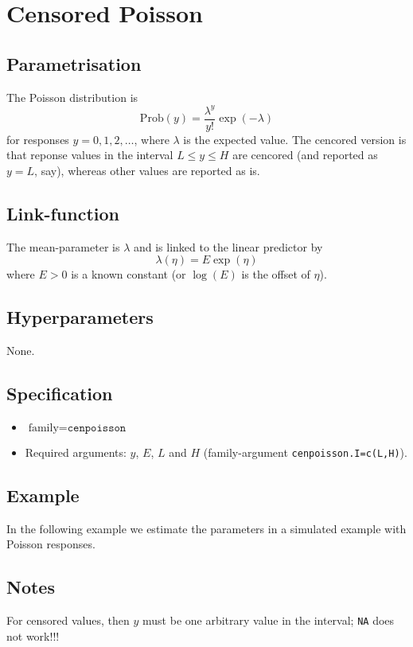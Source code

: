\documentclass[a4paper,11pt]{article}
\begin{document}
\section*{Censored Poisson}

\subsection*{Parametrisation}

The Poisson distribution is
\begin{displaymath}
    \text{Prob}(y) = \frac{\lambda^{y}}{y!}\exp(-\lambda)
\end{displaymath}
for responses $y=0, 1, 2, \ldots$, where $\lambda$ is the expected
value.  The cencored version is that reponse values in the interval
$L \le y \le H$ are cencored (and reported as $y=L$, say), whereas
other values are reported as is.

\subsection*{Link-function}

The mean-parameter is $\lambda$ and is linked to the linear predictor
by
\begin{displaymath}
    \lambda(\eta) = E \exp(\eta)
\end{displaymath}
where $E>0$ is a known constant (or $\log(E)$ is the offset of $\eta$).

\subsection*{Hyperparameters}

None.

\subsection*{Specification}

\begin{itemize}
\item $\text{family}=\texttt{cenpoisson}$
\item Required arguments: $y$, $E$, $L$ and $H$ (family-argument
    \texttt{cenpoisson.I=c(L,H)}).
\end{itemize}

\subsection*{Example}

In the following example we estimate the parameters in a simulated
example with Poisson responses.
{\small

}

\subsection*{Notes}

For censored values, then $y$ must be one arbitrary value in the interval; \texttt{NA} does not work!!!
\end{document}
